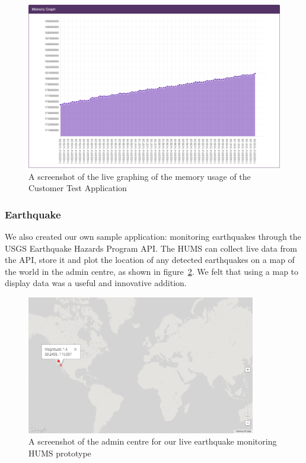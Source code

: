 \documentclass[10pt,a4paper]{article}
\begin{document}
\begin{figure}[htbp!]
  \centering
  \includegraphics[width=12cm]{images/TestApplicationMemoryGraph.png}
  \caption{A screenshot of the live graphing of the memory usage of the Customer 
  Test Application}
  \label{fig:graphing}
\end{figure}

\subsubsection{Earthquake}
We also created our own sample application: monitoring earthquakes 
through the USGS Earthquake Hazards Program API. The HUMS
can collect live data from the API, store it and plot the location of any
detected earthquakes on a map of the world in the admin centre, as shown
in figure~\ref{fig:plotearthquakes}. We felt that using a map to display
data was a useful and innovative addition.

\begin{figure}[htbp!]
  \centering
  \includegraphics[width=10cm]{images/plotearthquakes.png}
  \caption{A screenshot of the admin centre for our live earthquake monitoring HUMS prototype}
  \label{fig:plotearthquakes}
\end{figure}
\end{document}
